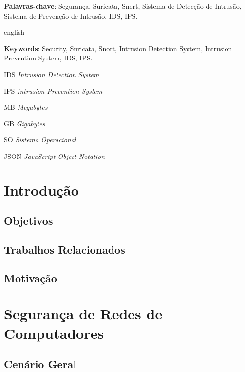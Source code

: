 \documentclass[
	12pt,				
	openright,		
	twoside,	
	a4paper,
	english,	
	brazil	
	]{abntex2}
\begin{document}
\setlength{\absparsep}{18pt} 
\begin{resumo}
 \textbf{Palavras-chave}: Segurança, Suricata, Snort, Sistema de Detecção de Intrusão, Sistema de Prevenção de Intrusão, IDS, IPS.
\end{resumo}
\begin{resumo}[Abstract]
 \begin{otherlanguage*}{english}
   \vspace{\onelineskip}
 
   \noindent 
   \textbf{Keywords}: Security, Suricata, Snort, Intrusion Detection System, Intrusion Prevention System, IDS, IPS.
 \end{otherlanguage*}
\end{resumo}
\listoffigures*
\cleardoublepage
{}
\listoftables*
\cleardoublepage
\begin{siglas}
  \item[IDS] \textit{Intrusion Detection System}
  \item[IPS] \textit{Intrusion Prevention System}
  \item[MB] \textit{Megabytes}
  \item[GB] \textit{Gigabytes}
  \item[SO] \textit{Sistema Operacional}
  \item[JSON] \textit{JavaScript Object Notation}
\end{siglas}
\tableofcontents*
\cleardoublepage
\textual
\chapter*[Introdução]{Introdução}
\section*{Objetivos}
\section*{Trabalhos Relacionados}
\section*{Motivação}
\chapter{Segurança de Redes de Computadores}
\section{Cenário Geral}
\end{document}
